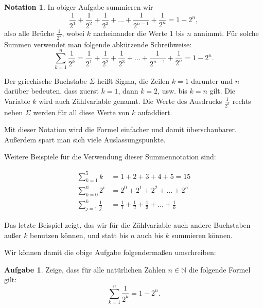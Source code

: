 \documentclass[a4paper,ngerman,12pt]{scrartcl}
\newcommand{\N}{\mathbb{N}}
\theoremstyle{definition}
\newtheorem*{aufg}{Aufgabe}
\newtheorem*{nota}{Notation}
\begin{document}
\begin{shaded}
  \begin{nota}
    In obiger Aufgabe summieren wir
    \[ \frac{1}{2^1} + \frac{1}{2^2} + \frac{1}{2^3} + ... + \frac{1}{2^{n-1}} + \frac{1}{2^n} = 1 - 2^n, \]
    also alle Brüche $\frac{1}{2^k}$, wobei $k$ nacheinander die Werte $1$ bis $n$ annimmt. Für solche Summen verwendet man folgende abkürzende Schreibweise:
    \[ \sum_{k=1}^n \frac{1}{2^k} = \frac{1}{2^1} + \frac{1}{2^2} + \frac{1}{2^3} + ... + \frac{1}{2^{n-1}} + \frac{1}{2^n} = 1 - 2^n. \]

    Der griechische Buchstabe $\Sigma$ heißt Sigma, die Zeilen $k=1$ darunter und $n$ darüber bedeuten, dass zuerst $k=1$, dann $k=2$, usw. bis $k=n$ gilt. Die Variable $k$ wird auch Zählvariable genannt. Die Werte des Ausdrucks $\frac{1}{2^k}$ rechts neben $\Sigma$ werden für all diese Werte von $k$ aufaddiert.

    Mit dieser Notation wird die Formel einfacher und damit überschaubarer. Außerdem spart man sich viele Auslassungspunkte.

    Weitere Beispiele für die Verwendung dieser Summennotation sind:

    \begin{align*}
      \sum_{k=1}^5 k &= 1 + 2 + 3 + 4 + 5 = 15 \\
      \sum_{k=0}^n 2^i &= 2^0 + 2^1 + 2^2 + ... + 2^n \\
      \sum_{j=1}^k \frac{1}{j} &= \frac{1}{1} + \frac{1}{2} + \frac{1}{3} + ... + \frac{1}{k}
    \end{align*}

    Das letzte Beispiel zeigt, das wir für die Zählvariable auch andere Buchstaben außer $k$ benutzen können, und statt bis $n$ auch bis $k$ summieren können.
  \end{nota}
\end{shaded}

Wir können damit die obige Aufgabe folgendermaßen umschreiben:

\begin{aufg}
  Zeige, dass für alle natürlichen Zahlen $n \in \N$ die folgende Formel gilt:
  \[ \sum_{k=1}^n \frac{1}{2^k} = 1 - 2^n. \]
\end{aufg}
\end{document}
